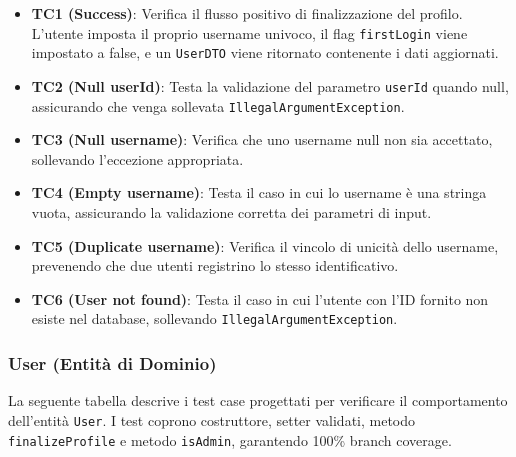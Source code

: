 ﻿\documentclass[11pt,a4paper]{article}
\begin{document}
\begin{itemize}
    \item \textbf{TC1 (Success)}: Verifica il flusso positivo di finalizzazione del profilo. L'utente imposta il proprio username univoco, il flag \texttt{firstLogin} viene impostato a false, e un \texttt{UserDTO} viene ritornato contenente i dati aggiornati.
    
    \item \textbf{TC2 (Null userId)}: Testa la validazione del parametro \texttt{userId} quando null, assicurando che venga sollevata \texttt{IllegalArgumentException}.
    
    \item \textbf{TC3 (Null username)}: Verifica che uno username null non sia accettato, sollevando l'eccezione appropriata.
    
    \item \textbf{TC4 (Empty username)}: Testa il caso in cui lo username è una stringa vuota, assicurando la validazione corretta dei parametri di input.
    
    \item \textbf{TC5 (Duplicate username)}: Verifica il vincolo di unicità dello username, prevenendo che due utenti registrino lo stesso identificativo.
    
    \item \textbf{TC6 (User not found)}: Testa il caso in cui l'utente con l'ID fornito non esiste nel database, sollevando \texttt{IllegalArgumentException}.
\end{itemize}

\clearpage

\subsubsection{User (Entità di Dominio)}

La seguente tabella descrive i test case progettati per verificare il comportamento dell'entità \texttt{User}. I test coprono costruttore, setter validati, metodo \texttt{finalizeProfile} e metodo \texttt{isAdmin}, garantendo 100\% branch coverage.\\
\end{document}
